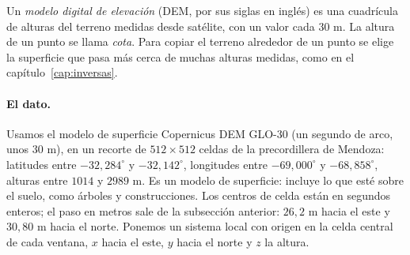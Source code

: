 \begin{idea}
Un \emph{modelo digital de elevación} (DEM, por sus siglas en inglés) es una cuadrícula de
alturas del terreno medidas desde satélite, con un valor cada \(30\) m. La altura de un punto se
llama \emph{cota}. Para copiar el terreno alrededor de un punto se elige la superficie que pasa
más cerca de muchas alturas medidas, como en el capítulo~\ref{cap:inversas}.
\end{idea}

\paragraph{El dato.} Usamos el modelo de superficie Copernicus DEM GLO-30 (un segundo
de arco, unos \(30\) m), en un recorte de \(512\times512\) celdas de la precordillera de
Mendoza: latitudes entre \(-32{,}284^\circ\) y \(-32{,}142^\circ\), longitudes entre
\(-69{,}000^\circ\) y \(-68{,}858^\circ\), alturas entre \(1014\) y \(2989\) m. Es un modelo de
superficie: incluye lo que esté sobre el suelo, como árboles y construcciones.
Los centros de celda están en segundos enteros; el paso en metros sale de la subsección
anterior: \(26{,}2\) m hacia el este y \(30{,}80\) m hacia el norte. Ponemos un sistema local
con origen en la celda central de cada ventana, \(x\) hacia el este, \(y\) hacia el norte y
\(z\) la altura.

